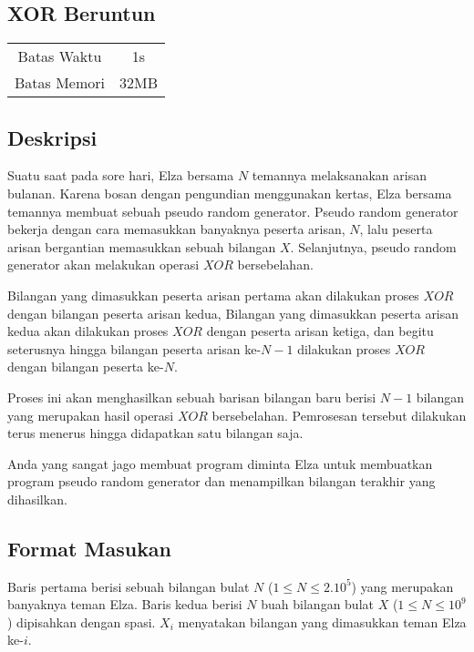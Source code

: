 \documentclass{article}
\begin{document}
\begin{center}
    \section*{XOR Beruntun} %

    \begin{tabular}{ | c c | }
        \hline
        Batas Waktu  & 1s \\    %
        Batas Memori & 32MB \\  %
        \hline
    \end{tabular}
\end{center}

\subsection*{Deskripsi}

Suatu saat pada sore hari, Elza bersama $N$ temannya melaksanakan arisan bulanan.
Karena bosan dengan pengundian menggunakan kertas, Elza bersama temannya membuat sebuah pseudo random generator.
Pseudo random generator bekerja dengan cara memasukkan banyaknya peserta arisan, $N$, lalu peserta arisan bergantian memasukkan sebuah bilangan $X$.
Selanjutnya, pseudo random generator akan melakukan operasi $XOR$ bersebelahan.

Bilangan yang dimasukkan peserta arisan pertama akan dilakukan proses $XOR$ dengan bilangan peserta arisan kedua, 
Bilangan yang dimasukkan peserta arisan kedua akan dilakukan proses $XOR$ dengan peserta arisan ketiga, 
dan begitu seterusnya hingga bilangan peserta arisan ke-$N - 1$ dilakukan proses $XOR$ dengan bilangan peserta ke-$N$.

Proses ini akan menghasilkan sebuah barisan bilangan baru berisi $N - 1$ bilangan yang merupakan hasil operasi $XOR$ bersebelahan. 
Pemrosesan tersebut dilakukan terus menerus hingga didapatkan satu bilangan saja.

Anda yang sangat jago membuat program diminta Elza untuk membuatkan program pseudo random generator dan menampilkan bilangan terakhir yang dihasilkan.

\subsection*{Format Masukan}

Baris pertama berisi sebuah bilangan bulat $N$ ($1 \leq N \leq 2.10^5$) yang merupakan banyaknya teman Elza.
Baris kedua berisi $N$ buah bilangan bulat $X$ ($1 \leq N \leq 10^9$) dipisahkan dengan spasi. $X_{i}$ menyatakan bilangan yang dimasukkan teman Elza ke-$i$.
\end{document}
